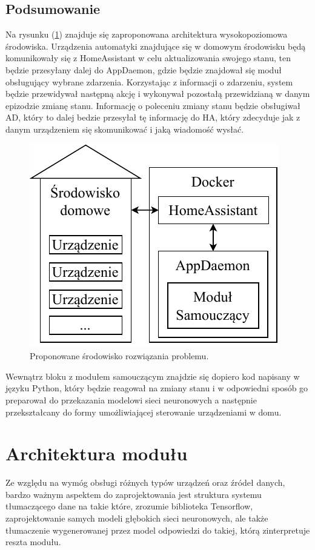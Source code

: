 \subsection{Podsumowanie}
Na rysunku (\ref{fig:architektura}) znajduje się zaproponowana architektura wysokopoziomowa środowiska. Urządzenia automatyki znajdujące się w domowym środowisku będą komunikowały się z HomeAssistant w celu aktualizowania swojego stanu, ten będzie przesyłany dalej do AppDaemon, gdzie będzie znajdował się moduł obsługujący wybrane zdarzenia. Korzystając z informacji o zdarzeniu, system będzie przewidywał następną akcję i wykonywał pozostałą przewidzianą w danym epizodzie zmianę stanu. Informację o poleceniu zmiany stanu będzie obsługiwał AD, który to dalej bedzie przesyłał tę informację do HA, który zdecyduje jak z danym urządzeniem się skomunikować i jaką wiadomość wysłać. 

\begin{figure}
    \centering\includegraphics[width=.45\textwidth]{img/architecture.pdf}
    \caption{Proponowane środowisko rozwiązania problemu.} \label{fig:architektura}
\end{figure}

Wewnątrz bloku z modułem samouczącym znajdzie się dopiero kod napisany w języku Python, który będzie reagował na zmiany stanu i w odpowiedni sposób go preparował do przekazania modelowi sieci neuronowych a następnie przekształcany do formy umożliwiającej sterowanie urządzeniami w domu.

\section{Architektura modułu}
Ze względu na wymóg obsługi różnych typów urządzeń oraz źródeł danych, bardzo ważnym aspektem do zaprojektowania jest struktura systemu tłumaczącego dane na takie które, zrozumie biblioteka Tensorflow, zaprojektowanie samych modeli głębokich sieci neuronowych, ale także tłumaczenie wygenerowanej przez model odpowiedzi do takiej, którą zinterpretuje reszta modułu.

